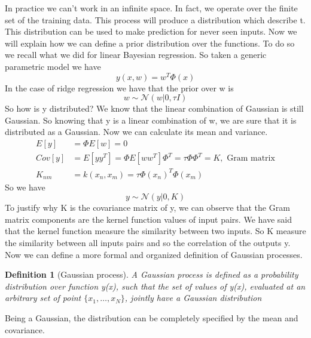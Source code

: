 \documentclass[main.tex]{subfiles}
\newtheorem{definition}{Definition}[section]
\begin{document}
In practice we can't work in an infinite space. In fact, we operate over the finite set of the training data. This process will produce a distribution which describe t. This distribution can be used to make prediction for never seen inputs.
Now we will explain how we can define a prior distribution over the functions. To do so we recall what we did for linear Bayesian regression. So taken a generic parametric model we have
\begin{equation*}
    y(x,w)=w^T \Phi(x)
\end{equation*}
In the case of ridge regression we have that the prior over w is
\begin{equation*}
    w \sim \mathcal{N}(w|0, \tau I)
\end{equation*}
So how is y distributed?\footnotemark {} We know that the linear combination of Gaussian is still Gaussian. So knowing that y is a linear combination of w, we are sure that it is distributed as a Gaussian. Now we can calculate its mean and variance.
\begin{align*}
    E[y]   & = \Phi E[w] = 0                                                             \\
    Cov[y] & = E[yy^T] = \Phi E[ww^T] \Phi^T = \tau \Phi \Phi^T = K, \text{ Gram matrix} \\
    K_{nm} & = k(x_n, x_m) = \tau\Phi(x_n)^T\Phi(x_m)
\end{align*}
So we have
\begin{equation}
    y \sim \mathcal{N}(y|0, K)
\end{equation}
To justify why K is the covariance matrix of y, we can observe that the Gram matrix components are the kernel function values of input pairs. We have said that the kernel function measure the similarity between two inputs. So K measure the similarity between all inputs pairs and so the correlation of the outputs y.
Now we can define a more formal and organized definition of Gaussian processes.
\begin{definition}[Gaussian process]
    A Gaussian process is defined as a probability distribution over function y(x), such that the set of values of y(x), evaluated at an arbitrary set of point $\{x_1, \dots, x_N\}$, jointly have a Gaussian distribution
\end{definition}
Being a Gaussian, the distribution can be completely specified by the mean and covariance.
\end{document}

